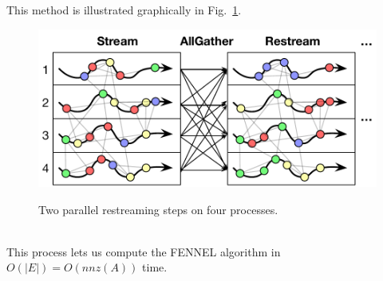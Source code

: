 This method is illustrated graphically in Fig.~\ref{fig:restream}.


\begin{figure}[ht]
\centering
  \includegraphics[width=1.0\columnwidth]{figures/restreamdiagram.pdf}
  \label{fig:restream}
  \caption{Two parallel restreaming steps on four processes.}
\end{figure}


\\



This process lets us compute the FENNEL algorithm in $O(|E|)=O(nnz(A))$ time.